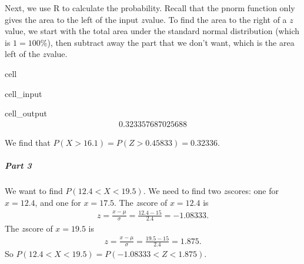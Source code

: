\documentclass[letterpaper,10pt,english]{jupyterBook}
\begin{document}
\sphinxAtStartPar
Next, we use R to calculate the probability. Recall that the pnorm function only gives the area to the left of the input \(z\)\sphinxhyphen{}value. To find the area to the right of a \(z\)\sphinxhyphen{}value, we start with the total area under the standard normal distribution (which is \(1 = 100\%\)), then subtract away the part that we don’t want, which is the area left of the \(z\)\sphinxhyphen{}value.

\begin{sphinxuseclass}{cell}\begin{sphinxVerbatimInput}

\begin{sphinxuseclass}{cell_input}
\begin{sphinxVerbatim}[commandchars=\\\{\}]
\end{sphinxVerbatim}

\end{sphinxuseclass}\end{sphinxVerbatimInput}
\begin{sphinxVerbatimOutput}

\begin{sphinxuseclass}{cell_output}\begin{equation*}
\begin{split}0.323357687025688\end{split}
\end{equation*}
\end{sphinxuseclass}\end{sphinxVerbatimOutput}

\end{sphinxuseclass}
\sphinxAtStartPar
We find that \(P(X > 16.1) = P(Z > 0.45833) = 0.32336\).


\subparagraph{Part 3}
\label{\detokenize{Ch4 The Normal Distribution and the Central Limit Theorem/4.3 The Normal Distribution and z-scores:part-3}}
\sphinxAtStartPar
We want to find \(P(12.4 < X < 19.5)\). We need to find two \(z\)\sphinxhyphen{}scores: one for \(x = 12.4\), and one for \(x = 17.5\). The \(z\)\sphinxhyphen{}score of \(x = 12.4\) is
\begin{equation*}
\begin{split} z = \frac{x - \mu}{\sigma} = \frac{12.4 - 15}{2.4} = -1.08333. \end{split}
\end{equation*}
\sphinxAtStartPar
The \(z\)\sphinxhyphen{}score of \(x = 19.5\) is
\begin{equation*}
\begin{split} z = \frac{x - \mu}{\sigma} = \frac{19.5 - 15}{2.4} = 1.875. \end{split}
\end{equation*}
\sphinxAtStartPar
So \(P(12.4 < X < 19.5) = P(-1.08333 < Z < 1.875)\).
\end{document}
